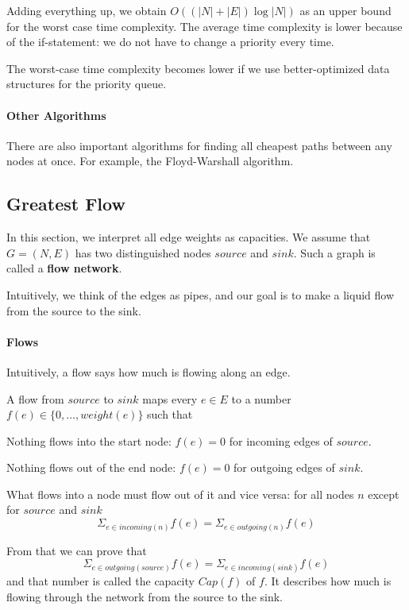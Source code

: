 Adding everything up, we obtain $O((|N|+|E|)\log|N|)$ as an upper bound for the worst case time complexity.
The average time complexity is lower because of the if-statement: we do not have to change a priority every time.

The worst-case time complexity becomes lower if we use better-optimized data structures for the priority queue.


\paragraph{Other Algorithms}
There are also important algorithms for finding all cheapest paths between any nodes at once.
For example, the Floyd-Warshall algorithm.

\subsection{Greatest Flow}\label{sec:ad:maximalflow}

In this section, we interpret all edge weights as capacities.
We assume that $G=(N,E)$ has two distinguished nodes $source$ and $sink$.
Such a graph is called a \textbf{flow network}.

Intuitively, we think of the edges as pipes, and our goal is to make a liquid flow from the source to the sink.

\paragraph{Flows}
Intuitively, a flow says how much is flowing along an edge.

A flow from $source$ to $sink$ maps every $e\in E$ to a number $f(e)\in \{0,\ldots,weight(e)\}$ such that
\begin{compactitem}
 \item Nothing flows into the start node: $f(e)=0$ for incoming edges of $source$.
 \item Nothing flows out of the end node: $f(e)=0$ for outgoing edges of $sink$.
 \item What flows into a node must flow out of it and vice versa: for all nodes $n$ except for $source$ and $sink$
  \[\Sigma_{e\in incoming(n)} f(e) = \Sigma_{e\in outgoing(n)} f(e)\]
\end{compactitem}

From that we can prove that
 \[\Sigma_{e\in outgoing(source)} f(e) = \Sigma_{e\in incoming(sink)} f(e)\]
and that number is called the capacity $Cap(f)$ of $f$.
It describes how much is flowing through the network from the source to the sink.

